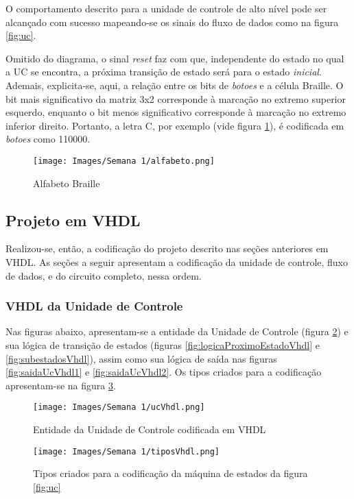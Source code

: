 \documentclass[amsmath,amssymb,floatfix]{report}
\begin{document}
O comportamento descrito para a unidade de controle de alto nível pode ser alcançado com sucesso mapeando-se os sinais do fluxo de dados como na figura \ref{fig:uc}.

Omitido do diagrama, o sinal \textit{reset} faz com que, independente do estado no qual a UC se encontra, a próxima transição de estado será para o estado \textit{inicial}. Ademais, explicita-se, aqui, a relação entre os bits de \textit{botoes} e a célula Braille. O bit mais significativo da matriz 3x2 corresponde à marcação no extremo superior esquerdo, enquanto o bit menos significativo corresponde à marcação no extremo inferior direito. Portanto, a letra C, por exemplo (vide figura \ref{fig:alfabeto}), é codificada em \textit{botoes} como 110000.

\begin{figure}[H]
    \centering
    \texttt{[image: Images/Semana 1/alfabeto.png]}
    \caption{Alfabeto Braille}
    \label{fig:alfabeto}
\end{figure}


\subsection{Projeto em VHDL}
\label{subsec:projetoVhdl1}

Realizou-se, então, a codificação do projeto descrito nas seções anteriores em VHDL. As seções a seguir apresentam a codificação da unidade de controle, fluxo de dados, e do circuito completo, nessa ordem.

\subsubsection{VHDL da Unidade de Controle}
\label{subsubsec:ucVhdl1}

Nas figuras abaixo, apresentam-se a entidade da Unidade de Controle (figura \ref{fig:ucVhdl}) e sua lógica de transição de estados (figuras \ref{fig:logicaProximoEstadoVhdl} e \ref{fig:subestadosVhdl}), assim como sua lógica de saída nas figuras \ref{fig:saidaUcVhdl1} e \ref{fig:saidaUcVhdl2}. Os tipos criados para a codificação apresentam-se na figura \ref{fig:tiposVhdl}.

\begin{figure}[H]
    \centering
    \texttt{[image: Images/Semana 1/ucVhdl.png]}
    \caption{Entidade da Unidade de Controle codificada em VHDL}
    \label{fig:ucVhdl}
\end{figure}

\begin{figure}[H]
    \centering
    \texttt{[image: Images/Semana 1/tiposVhdl.png]}
    \caption{Tipos criados para a codificação da máquina de estados da figura \ref{fig:uc}}
    \label{fig:tiposVhdl}
\end{figure}
\end{document}
